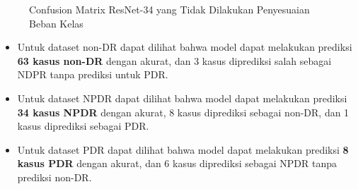 \begin{figure}[hbtp]
	\centering
	\qquad
	\qquad
	\caption{Confusion Matrix ResNet-34 yang Tidak Dilakukan Penyesuaian Beban Kelas}
	\label{fig:confRes34}
\end{figure}

\begin{itemize}
	\item Untuk dataset non-DR dapat dilihat bahwa model dapat melakukan prediksi \textbf{63 kasus non-DR} dengan akurat, dan 3 kasus diprediksi salah sebagai NDPR tanpa prediksi untuk PDR.
	
	\item Untuk dataset NPDR dapat dilihat bahwa model dapat melakukan prediksi \textbf{34 kasus NPDR} dengan akurat, 8 kasus diprediksi sebagai non-DR, dan 1 kasus diprediksi sebagai PDR.
	
	\item Untuk dataset PDR dapat dilihat bahwa model dapat melakukan prediksi \textbf{8 kasus PDR} dengan akurat, dan 6 kasus diprediksi sebagai NPDR tanpa prediksi non-DR.
\end{itemize}
\pagebreak


